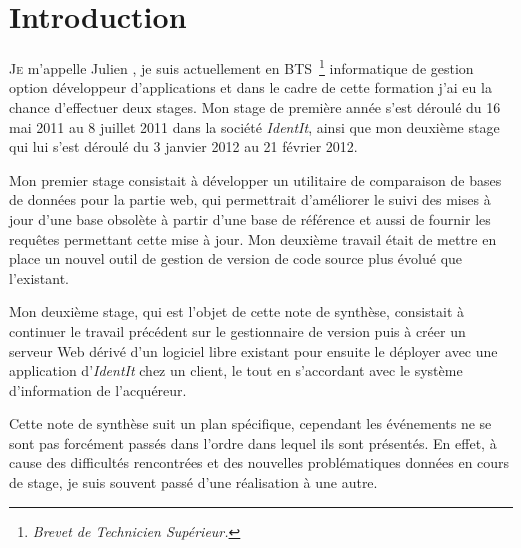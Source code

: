 \chapter{Introduction} %
\label{cha:Introduction}

\lettrine{J}{e} m'appelle Julien , je suis actuellement en
BTS\, \footnote{\emph{Brevet de Technicien Supérieur.}} informatique de
gestion option développeur d'applications et dans le cadre de cette
formation j'ai eu la chance d'effectuer deux stages. Mon stage de
première année s'est déroulé du 16 mai 2011 au 8 juillet 2011 dans la
société \emph{IdentIt}, ainsi que mon deuxième stage qui lui s'est
déroulé du 3 janvier 2012 au 21 février 2012.

Mon premier stage consistait à développer un utilitaire de comparaison
de bases de données pour la partie web, qui permettrait d'améliorer le
suivi des mises à jour d'une base obsolète à partir d'une base de
référence et aussi de fournir les requêtes permettant cette mise à jour.
Mon deuxième travail était de mettre en place un nouvel outil de gestion
de version de code source plus évolué que l'existant.

Mon deuxième stage, qui est l'objet de cette note de synthèse,
consistait à continuer le travail précédent sur le gestionnaire de
version puis à créer un serveur Web dérivé d'un logiciel libre existant
pour ensuite le déployer avec une application d'\emph{IdentIt} chez un
client, le tout en s'accordant avec le système d'information de
l'acquéreur.

Cette note de synthèse suit un plan spécifique, cependant les événements
ne se sont pas forcément passés dans l'ordre dans lequel ils sont
présentés. En effet, à cause des difficultés rencontrées et des
nouvelles problématiques données en cours de stage, je suis souvent
passé d'une réalisation à une autre.

